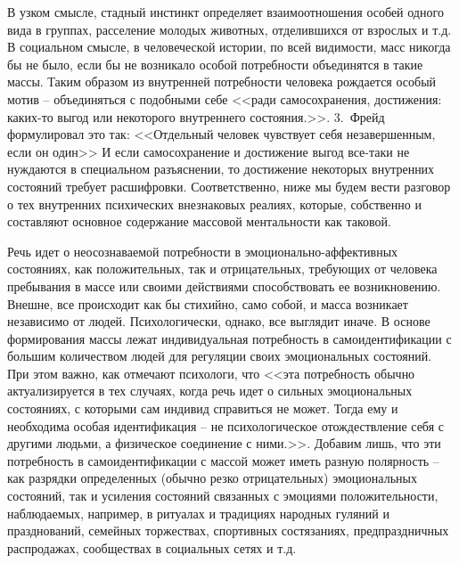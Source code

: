 В узком смысле, стадный инстинкт определяет взаимоотношения особей одного вида в группах, расселение молодых животных,
отделившихся от взрослых и т.д. В социальном смысле, в человеческой истории, по всей видимости, масс никогда бы не
было, если бы не возникало особой потребности объединятся в такие массы. Таким образом из внутренней потребности
человека рождается особый мотив -- объединяться с подобными себе <<ради самосохранения, достижения: каких-то выгод
или некоторого внутреннего состояния.>>\autocite{olshansky}.  3.~Фрейд формулировал это так: <<Отдельный человек чувствует
себя незавершенным, если он один>>\autocite{freid_mass} И если самосохранение и достижение выгод все-таки не
нуждаются в специальном разъяснении, то достижение некоторых внутренних состояний требует расшифровки.
Соответственно, ниже мы будем вести разговор о тех внутренних психических внезнаковых реалиях, которые,
собственно и составляют основное содержание массовой ментальности как таковой.

Речь идет о неосознаваемой потребности в эмоционально\hyp{}аффективных состояниях, как положительных,
так и отрицательных, требующих от человека пребывания в массе или своими действиями способствовать ее возникновению.
Внешне, все происходит как бы стихийно, само собой, и масса возникает независимо от людей. Психологически, однако, все выглядит иначе. В основе формирования массы лежат индивидуальная потребность в
самоидентификации с большим количеством людей для регуляции своих эмоциональных состояний. При этом важно, как
отмечают психологи, что <<эта потребность обычно актуализируется в тех случаях, когда речь идет о сильных
эмоциональных состояниях, с которыми сам индивид справиться не может. Тогда ему и необходима особая идентификация --
не психологическое отождествление себя с другими людьми, а физическое соединение с ними.>>\autocite{olshansky}.  Добавим лишь,
что эти потребность в самоидентификации с массой может иметь разную полярность -- как разрядки определенных
(обычно резко отрицательных) эмоциональных состояний, так и усиления состояний связанных с эмоциями положительности,
наблюдаемых, например, в ритуалах и традициях народных гуляний и празднований, семейных торжествах, спортивных
состязаниях, предпраздничных распродажах, сообществах в социальных сетях и т.д.

